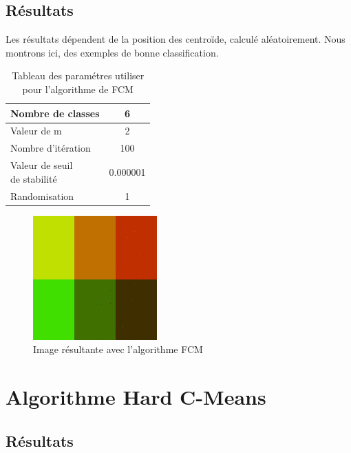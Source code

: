 \documentclass[a4paper,11pt]{article}
\begin{document}
\subsection{Résultats}

Les résultats dépendent de la position des centroïde, calculé aléatoirement. 
Nous montrons ici, des exemples de bonne classification.

\begin{table}[H]
  \begin{center}
    \begin{tabular}{|l|c|}
      \hline
      Nombre de classes & 6 \\
      \hline
      Valeur de m & 2 \\
      \hline
      Nombre d'itération & 100 \\
      \hline
      \shortstack{ Valeur de seuil \\ de stabilité } & 0.000001 \\
      \hline
      Randomisation & 1 \\
      \hline
    \end{tabular}
    \caption{Tableau des paramétres utiliser pour l'algorithme de FCM}
  \end{center}
\end{table}


\begin{figure}[H]
  \begin{center} 
    \includegraphics[width=180px]{../img/segFCM.png}
    \caption{Image résultante avec l'algorithme FCM}
  \end{center}
\end{figure}

\section{Algorithme Hard C-Means}

\subsection{Résultats}
\end{document}
